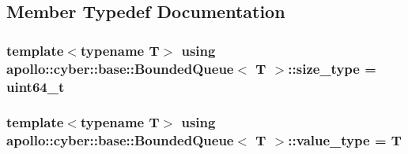 \subsection{Member Typedef Documentation}
\hypertarget{classapollo_1_1cyber_1_1base_1_1BoundedQueue_a3e14c54e4e45f2c586432a976e455e84}{
\subsubsection[{size\-\_\-type}]{\setlength{\rightskip}{0pt plus 5cm}template$<$typename T$>$ using {\bf apollo\-::cyber\-::base\-::\-Bounded\-Queue}$<$ T $>$\-::{\bf size\-\_\-type} =  uint64\-\_\-t}}\label{classapollo_1_1cyber_1_1base_1_1BoundedQueue_a3e14c54e4e45f2c586432a976e455e84}
\hypertarget{classapollo_1_1cyber_1_1base_1_1BoundedQueue_a7ed1030141bc62c66ce2c41b6bfdfa58}{
\subsubsection[{value\-\_\-type}]{\setlength{\rightskip}{0pt plus 5cm}template$<$typename T$>$ using {\bf apollo\-::cyber\-::base\-::\-Bounded\-Queue}$<$ T $>$\-::{\bf value\-\_\-type} =  T}}\label{classapollo_1_1cyber_1_1base_1_1BoundedQueue_a7ed1030141bc62c66ce2c41b6bfdfa58}


